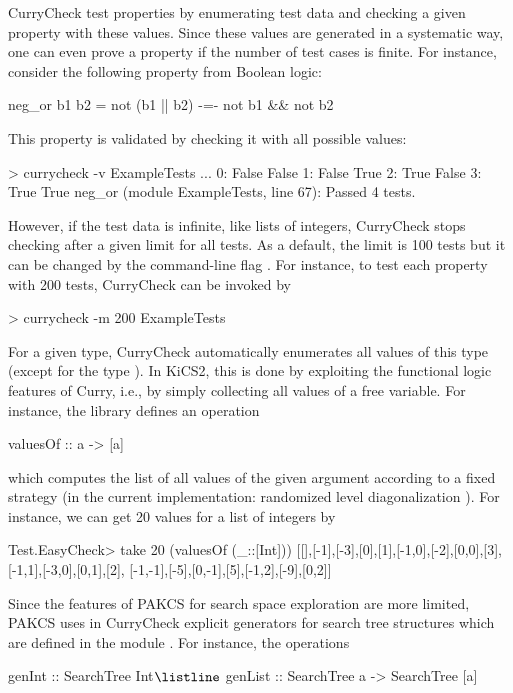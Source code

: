 CurryCheck test properties by enumerating test data and
checking a given property with these values.
Since these values are generated in a systematic way,
one can even prove a property if the number of test cases
is finite. For instance, consider the following property
from Boolean logic:
\begin{curry}
neg_or b1 b2 = not (b1 || b2) -=- not b1 && not b2
\end{curry}
This property is validated by checking it with all possible values:
%
\begin{curry}
> currycheck -v ExampleTests
...
0:
False
False
1:
False
True
2:
True
False
3:
True
True
neg_or (module ExampleTests, line 67):
 Passed 4 tests.
\end{curry}
%
However, if the test data is infinite, like lists of integers,
CurryCheck stops checking after a given limit for all tests.
As a default, the limit is 100 tests but it can be changed
by the command-line flag . For instance, to test
each property with 200 tests, CurryCheck can be invoked by
%
\begin{curry}
> currycheck -m 200 ExampleTests
\end{curry}
%
For a given type, CurryCheck automatically enumerates all values
of this type (except for the type ).
In KiCS2, this is done by exploiting the functional logic features
of Curry, i.e., by simply collecting all values of a free variable.
For instance, the library 
defines an operation
\begin{curry}
valuesOf :: a -> [a]
\end{curry}
which computes the list of all values of the given argument
according to a fixed strategy (in the current implementation:
randomized level diagonalization \cite{ChristiansenFischer08FLOPS}).
For instance, we can get 20 values for a list of integers by
%
\begin{curry}
Test.EasyCheck> take 20 (valuesOf (_::[Int]))
[[],[-1],[-3],[0],[1],[-1,0],[-2],[0,0],[3],[-1,1],[-3,0],[0,1],[2],
[-1,-1],[-5],[0,-1],[5],[-1,2],[-9],[0,2]]
\end{curry}
%
Since the features of PAKCS for search space exploration are more limited,
PAKCS uses in CurryCheck explicit generators for search tree structures
which are defined in the module .
For instance, the operations
%
\begin{curry}
genInt :: SearchTree Int$\listline$
genList :: SearchTree a -> SearchTree [a]
\end{curry}

